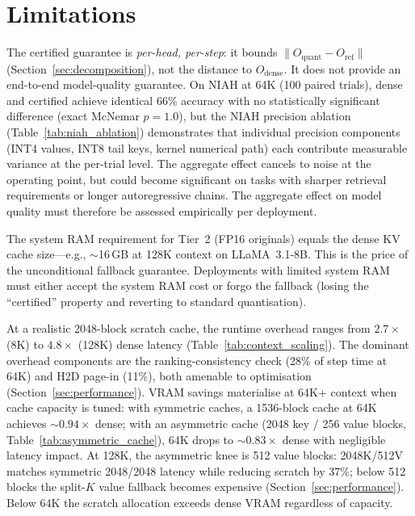 \documentclass[11pt,a4paper]{article}
\theoremstyle{definition}
\theoremstyle{remark}
\newcommand{\norm}[1]{\lVert #1 \rVert}
\begin{document}
\section{Limitations}
\label{sec:limitations}

The certified guarantee is \emph{per-head, per-step}: it bounds $\norm{O_{\mathrm{quant}} - O_{\mathrm{ref}}}$ (Section~\ref{sec:decomposition}), not the distance to $O_{\mathrm{dense}}$.  It does not provide an end-to-end model-quality guarantee.  On NIAH at 64K (100 paired trials), dense and certified achieve identical 66\% accuracy with no statistically significant difference (exact McNemar $p{=}1.0$), but the NIAH precision ablation (Table~\ref{tab:niah_ablation}) demonstrates that individual precision components (INT4 values, INT8 tail keys, kernel numerical path) each contribute measurable variance at the per-trial level.  The aggregate effect cancels to noise at the operating point, but could become significant on tasks with sharper retrieval requirements or longer autoregressive chains.  The aggregate effect on model quality must therefore be assessed empirically per deployment.

The system RAM requirement for Tier~2 (FP16 originals) equals the dense KV cache size---e.g., $\sim$16\,GB at 128K context on LLaMA~3.1-8B.  This is the price of the unconditional fallback guarantee.  Deployments with limited system RAM must either accept the system RAM cost or forgo the fallback (losing the ``certified'' property and reverting to standard quantisation).

At a realistic 2048-block scratch cache, the runtime overhead ranges from $2.7\times$ (8K) to $4.8\times$ (128K) dense latency (Table~\ref{tab:context_scaling}).  The dominant overhead components are the ranking-consistency check (28\% of step time at 64K) and H2D page-in (11\%), both amenable to optimisation (Section~\ref{sec:performance}).  VRAM savings materialise at 64K+ context when cache capacity is tuned: with symmetric caches, a 1536-block cache at 64K achieves ${\sim}0.94\times$ dense; with an asymmetric cache (2048 key / 256 value blocks, Table~\ref{tab:asymmetric_cache}), 64K drops to ${\sim}0.83\times$ dense with negligible latency impact.  At 128K, the asymmetric knee is 512 value blocks: 2048K/512V matches symmetric 2048/2048 latency while reducing scratch by 37\%; below 512 blocks the split-$K$ value fallback becomes expensive (Section~\ref{sec:performance}).  Below 64K the scratch allocation exceeds dense VRAM regardless of capacity.
\end{document}

